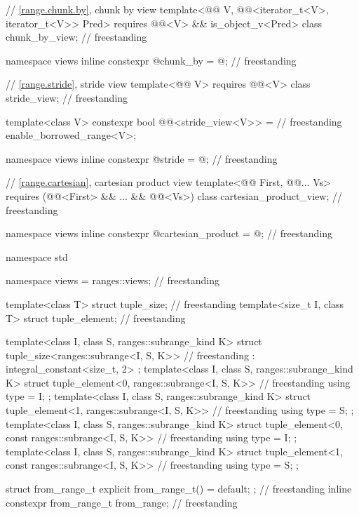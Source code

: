 \begin{codeblock}
{  // \ref{range.chunk.by}, chunk by view
  template<@@ V, @@<iterator_t<V>, iterator_t<V>> Pred>
    requires @@<V> && is_object_v<Pred>
  class chunk_by_view;                                                              // freestanding

  namespace views { inline constexpr @\unspecnc@ chunk_by = @\unspecnc@; }          // freestanding

  // \ref{range.stride}, stride view
  template<@@ V>
    requires @@<V>
  class stride_view;                                                                // freestanding

  template<class V>
    constexpr bool @@<stride_view<V>> =                          // freestanding
      enable_borrowed_range<V>;

  namespace views { inline constexpr @\unspecnc@ stride = @\unspecnc@; }            // freestanding

  // \ref{range.cartesian}, cartesian product view
  template<@@ First, @@... Vs>
    requires (@@<First> && ... && @@<Vs>)
  class cartesian_product_view;                                                     // freestanding

  namespace views { inline constexpr @\unspecnc@ cartesian_product = @\unspecnc@; } // freestanding
}

namespace std {
  namespace views = ranges::views;                                                  // freestanding

  template<class T> struct tuple_size;                                              // freestanding
  template<size_t I, class T> struct tuple_element;                                 // freestanding

  template<class I, class S, ranges::subrange_kind K>
  struct tuple_size<ranges::subrange<I, S, K>>                                      // freestanding
    : integral_constant<size_t, 2> {};
  template<class I, class S, ranges::subrange_kind K>
  struct tuple_element<0, ranges::subrange<I, S, K>> {                              // freestanding
    using type = I;
  };
  template<class I, class S, ranges::subrange_kind K>
  struct tuple_element<1, ranges::subrange<I, S, K>> {                              // freestanding
    using type = S;
  };
  template<class I, class S, ranges::subrange_kind K>
  struct tuple_element<0, const ranges::subrange<I, S, K>> {                        // freestanding
    using type = I;
  };
  template<class I, class S, ranges::subrange_kind K>
  struct tuple_element<1, const ranges::subrange<I, S, K>> {                        // freestanding
    using type = S;
  };

  struct from_range_t { explicit from_range_t() = default; };                       // freestanding
  inline constexpr from_range_t from_range{};                                       // freestanding
}
\end{codeblock}

